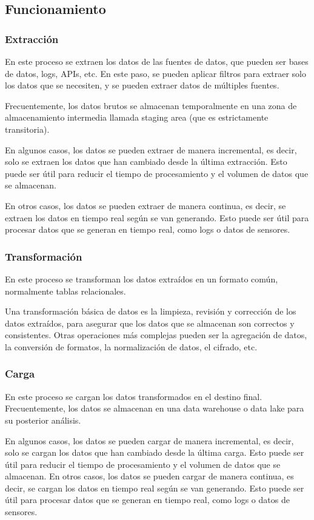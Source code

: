 \subsection{Funcionamiento}
\subsubsection{Extracción}
En este proceso se extraen los datos de las fuentes de datos, que pueden ser bases de datos, logs,
APIs, etc. En este paso, se pueden aplicar filtros para extraer solo los datos que se necesiten, y
se pueden extraer datos de múltiples fuentes.

Frecuentemente, los datos brutos se almacenan temporalmente en una zona de almacenamiento intermedia
llamada staging area (que es estrictamente transitoria).

En algunos casos, los datos se pueden extraer de manera incremental, es decir, solo se extraen los
datos que han cambiado desde la última extracción. Esto puede ser útil para reducir el tiempo de
procesamiento y el volumen de datos que se almacenan.

En otros casos, los datos se pueden extraer de manera continua, es decir, se extraen los datos en
tiempo real según se van generando. Esto puede ser útil para procesar datos que se generan en tiempo
real, como logs o datos de sensores.

\subsubsection{Transformación}
En este proceso se transforman los datos extraídos en un formato común, normalmente tablas relacionales.

Una transformación básica de datos es la limpieza, revisión y corrección de los datos extraídos,
para asegurar que los datos que se almacenan son correctos y consistentes. Otras operaciones más
complejas pueden ser la agregación de datos, la conversión de formatos, la normalización de datos,
el cifrado, etc.

\subsubsection{Carga}
En este proceso se cargan los datos transformados en el destino final. Frecuentemente, los datos se
almacenan en una data warehouse o data lake para su posterior análisis.

En algunos casos, los datos se pueden cargar de manera incremental, es decir, solo se cargan los datos
que han cambiado desde la última carga. Esto puede ser útil para reducir el tiempo de procesamiento y
el volumen de datos que se almacenan. En otros casos, los datos se pueden cargar de manera continua,
es decir, se cargan los datos en tiempo real según se van generando. Esto puede ser útil para procesar
datos que se generan en tiempo real, como logs o datos de sensores.

